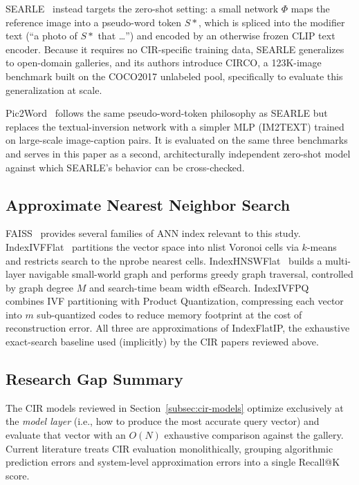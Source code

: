 \documentclass[conference]{IEEEtran}
\begin{document}
SEARLE~\cite{baldrati2023zero} instead targets the zero-shot setting: a small network $\Phi$ maps the reference image into a pseudo-word token $S{*}$, which is spliced into the modifier text (``a photo of $S{*}$ that {\dots}'') and encoded by an otherwise frozen CLIP text encoder. Because it requires no CIR-specific training data, SEARLE generalizes to open-domain galleries, and its authors introduce CIRCO, a 123K-image benchmark built on the COCO2017 unlabeled pool, specifically to evaluate this generalization at scale.

Pic2Word~\cite{saito2023pic2word} follows the same pseudo-word-token philosophy as SEARLE but replaces the textual-inversion network with a simpler MLP (IM2TEXT) trained on large-scale image-caption pairs. It is evaluated on the same three benchmarks and serves in this paper as a second, architecturally independent zero-shot model against which SEARLE's behavior can be cross-checked.

\subsection{Approximate Nearest Neighbor Search}
\label{subsec:ann}

FAISS~\cite{johnson2019faiss} provides several families of ANN index relevant to this study. IndexIVFFlat~\cite{sivic2003ivf} partitions the vector space into nlist Voronoi cells via $k$-means and restricts search to the nprobe nearest cells. IndexHNSWFlat~\cite{malkov2018hnsw} builds a multi-layer navigable small-world graph and performs greedy graph traversal, controlled by graph degree $M$ and search-time beam width efSearch. IndexIVFPQ~\cite{jegou2011pq} combines IVF partitioning with Product Quantization, compressing each vector into $m$ sub-quantized codes to reduce memory footprint at the cost of reconstruction error. All three are approximations of IndexFlatIP, the exhaustive exact-search baseline used (implicitly) by the CIR papers reviewed above.

\subsection{Research Gap Summary}
\label{subsec:research-gap}

The CIR models reviewed in Section~\ref{subsec:cir-models} optimize exclusively at the \emph{model layer} (i.e., how to produce the most accurate query vector) and evaluate that vector with an $O(N)$ exhaustive comparison against the gallery. Current literature treats CIR evaluation monolithically, grouping algorithmic prediction errors and system-level approximation errors into a single Recall@K score. 
\end{document}
